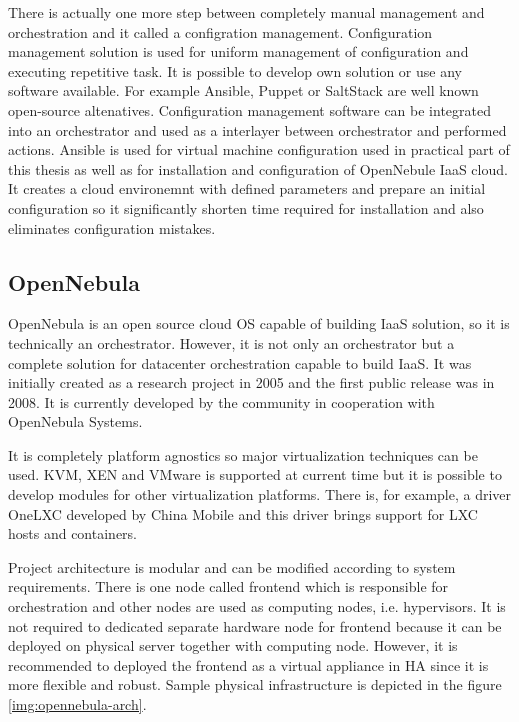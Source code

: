 There is actually one more step between completely manual management and orchestration and it called a configration management. Configuration management solution is used for uniform management of configuration and executing repetitive task. It is possible to develop own solution or use any software available. For example Ansible, Puppet or SaltStack are well known open-source altenatives. Configuration management software can be integrated into an orchestrator and used as a interlayer between orchestrator and performed actions.
Ansible is used for virtual machine configuration used in practical part of this thesis as well as for installation and configuration of OpenNebule IaaS cloud. It creates a cloud environemnt with defined parameters and prepare an initial configuration so it significantly shorten time required for installation and also eliminates configuration mistakes.  

\subsection{OpenNebula}
OpenNebula is an open source cloud OS capable of building IaaS solution, so it is technically an orchestrator. \cite{opennebula} However, it is not only an orchestrator but a complete solution for datacenter orchestration capable to build \Ac{IaaS}. It was initially created as a research project in 2005 and the first public release was in 2008. It is currently developed by the community in cooperation with OpenNebula Systems.

It is completely platform agnostics so major virtualization techniques can be used. \Ac{KVM}, XEN and VMware is supported at current time but it is possible to develop modules for other virtualization platforms. There is, for example, a driver OneLXC developed by China Mobile and this driver brings support for \Ac{LXC} hosts and containers.

Project architecture is modular and can be modified according to system requirements. There is one node called frontend which is responsible for orchestration and other nodes are used as computing nodes, i.e. hypervisors. It is not required to dedicated separate hardware node for frontend because it can be deployed on physical server together with computing node. However, it is recommended to deployed the frontend as a virtual appliance in \Ac{HA} since it is more flexible and robust. Sample physical infrastructure is depicted in the figure \ref{img:opennebula-arch}.

